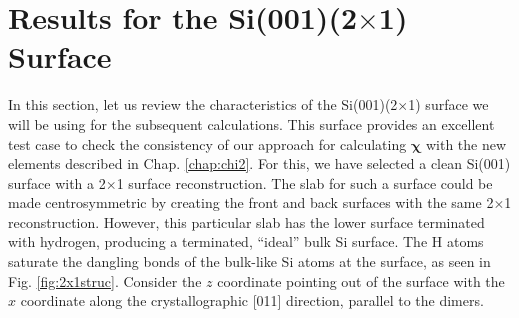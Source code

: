 
\section{Results for the \texorpdfstring{Si(001)(2$\times$1)}{Si(001)(2x1)}
Surface}\label{sec:Si2x1results}

In this section, let us review the characteristics of the Si(001)(2$\times$1)
surface we will be using for the subsequent calculations. This surface provides
an excellent test case to check the consistency of our approach for calculating
$\boldsymbol{\chi}$ with the new elements described in Chap. \ref{chap:chi2}.
For this, we have selected a clean Si(001) surface with a 2$\times$1 surface
reconstruction. The slab for such a surface could be made centrosymmetric by
creating the front and back surfaces with the same 2$\times$1 reconstruction.
However, this particular slab has the lower surface terminated with hydrogen,
producing a terminated, ``ideal'' bulk Si surface. The H atoms saturate the
dangling bonds of the bulk-like Si atoms at the surface, as seen in Fig.
\ref{fig:2x1struc}. Consider the $z$ coordinate pointing out of the surface with
the $x$ coordinate along the crystallographic [011] direction, parallel to the
dimers.

